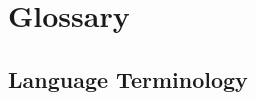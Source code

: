 \newcommand{\namelistlabel}[1]{\mbox{#1}\hfil}
\newenvironment{namelist}[1]{%
\begin{list}{}
       {\let\makelabel\namelistlabel
        \settowidth{\labelwidth}{#1}
        \setlength{\leftmargin}{1.3\labelwidth}
}
}{%
\end{list}}

\newcommand{\gitem}[1]{\item[{\parbox[b]{3.3cm}{\raggedleft \bf \Term{#1}}}]}


\section{Glossary}

\subsection{Language Terminology}

